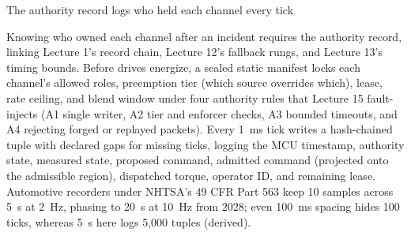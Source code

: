 \documentclass[aspectratio=169, 12pt]{beamer}
\begin{document}
\begin{frame}{The authority record logs who held each channel every tick}
{  Knowing who owned each channel after an incident requires the authority record, linking Lecture 1's record chain, Lecture 12's fallback rungs, and Lecture 13's timing bounds. Before drives energize, a sealed static manifest locks each channel's allowed roles, preemption tier (which source overrides which), lease, rate ceiling, and blend window under four authority rules that Lecture 15 fault-injects (A1 single writer, A2 tier and enforcer checks, A3 bounded timeouts, and A4 rejecting forged or replayed packets). Every 1~ms tick writes a hash-chained tuple with declared gaps for missing ticks, logging the MCU timestamp, authority state, measured state, proposed command, admitted command (projected onto the admissible region), dispatched torque, operator ID, and remaining lease. Automotive recorders under NHTSA's 49 CFR Part 563 keep 10 samples across 5~s at 2~Hz, phasing to 20~s at 10~Hz from 2028; even 100~ms spacing hides 100 ticks, whereas 5~s here logs 5,000 tuples (derived).


}
\end{frame}
\end{document}
